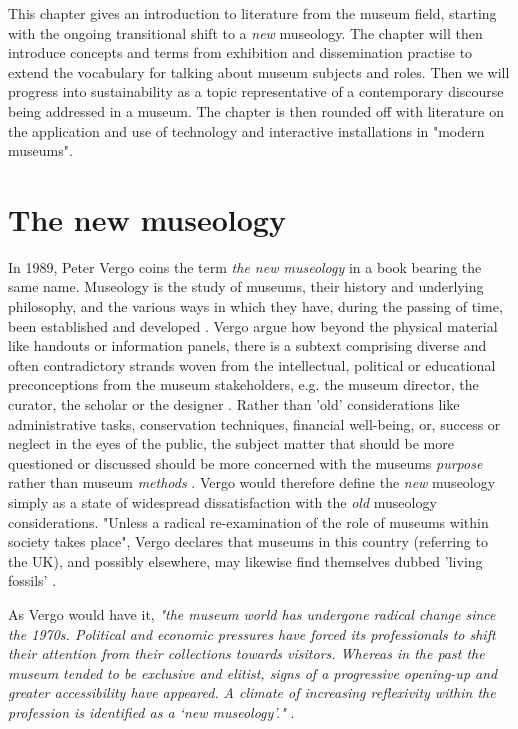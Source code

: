
This chapter gives an introduction to literature from the museum field, starting with the ongoing transitional shift to a \emph{new} museology. The chapter will then introduce concepts and terms from exhibition and dissemination practise to extend the vocabulary for talking about museum subjects and roles. Then we will progress into sustainability as a topic representative of a contemporary discourse being addressed in a museum. The chapter is then rounded off with literature on the application and use of technology and interactive installations in "modern museums".

\section{The new museology}
In 1989, Peter Vergo coins the term \emph{the new museology} in a book bearing the same name. Museology is the study of museums, their history and underlying philosophy, and the various ways in which they have, during the passing of time, been established and developed \autocite[p.1]{vergo_museology_1989}. Vergo argue how beyond the physical material like handouts or information panels, there is a subtext comprising diverse and often contradictory strands woven from the intellectual, political or educational preconceptions from the museum stakeholders, e.g. the museum director, the curator, the scholar or the designer \autocite[p.3]{vergo_museology_1989}. Rather than 'old' considerations like administrative tasks, conservation techniques, financial well-being, or, success or neglect in the eyes of the public, the subject matter that should be more questioned or discussed should be more concerned with the museums \emph{purpose} rather than museum \emph{methods} \autocite[p.3]{vergo_museology_1989}. Vergo would therefore define the \emph{new} museology simply as a state of widespread dissatisfaction with the \emph{old} museology considerations. "Unless a radical re-examination of the role of museums within society takes place", Vergo declares that museums in this country (referring to the UK), and possibly elsewhere, may likewise find themselves dubbed 'living fossils' \autocite[p.4]{vergo_museology_1989}.

As Vergo would have it, \emph{"the museum world has undergone radical change since the 1970s. Political and economic pressures have forced its professionals to shift their attention from their collections towards visitors. Whereas in the past the museum tended to be exclusive and elitist, signs of a progressive opening-up and greater accessibility have appeared. A climate of increasing reflexivity within the profession is identified as a ‘new museology’."} \autocite[p. 84]{ross_interpreting_2015}.

